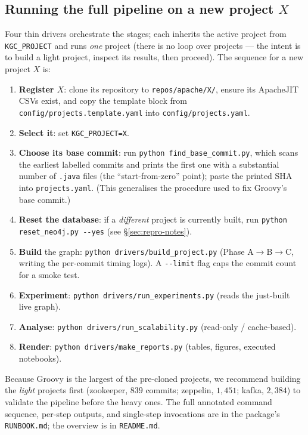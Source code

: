 \documentclass[11pt,a4paper]{article}
\newcommand{\code}[1]{\texttt{#1}}
\begin{document}
	\subsection{Running the full pipeline on a new project \texorpdfstring{$X$}{X}}\label{sec:repro-run}
	Four thin drivers orchestrate the stages; each inherits the active project from
	\code{KGC\_PROJECT} and runs \emph{one} project (there is no loop over projects ---
	the intent is to build a light project, inspect its results, then proceed). The
	sequence for a new project $X$ is:
	\begin{enumerate}[nosep,leftmargin=1.4em]
		\item \textbf{Register $X$}: clone its repository to \code{repos/apache/X/},
		ensure its ApacheJIT CSVs exist, and copy the template block from
		\code{config/projects.template.yaml} into \code{config/projects.yaml}.
		\item \textbf{Select it}: set \code{KGC\_PROJECT=X}.
		\item \textbf{Choose its base commit}: run \code{python find\_base\_commit.py},
		which scans the earliest labelled commits and prints the first one with a
		substantial number of \code{.java} files (the ``start-from-zero'' point); paste
		the printed SHA into \code{projects.yaml}. (This generalises the procedure used
		to fix Groovy's base commit.)
		\item \textbf{Reset the database}: if a \emph{different} project is currently
		built, run \code{python reset\_neo4j.py -{-}yes} (see \S\ref{sec:repro-notes}).
		\item \textbf{Build} the graph: \code{python drivers/build\_project.py}
		(Phase A$\to$B$\to$C, writing the per-commit timing logs). A \code{-{-}limit}
		flag caps the commit count for a smoke test.
		\item \textbf{Experiment}: \code{python drivers/run\_experiments.py} (reads the
		just-built live graph).
		\item \textbf{Analyse}: \code{python drivers/run\_scalability.py} (read-only /
		cache-based).
		\item \textbf{Render}: \code{python drivers/make\_reports.py} (tables, figures,
		executed notebooks).
	\end{enumerate}
	Because Groovy is the largest of the pre-cloned projects, we recommend building the
	\emph{light} projects first (zookeeper, $839$ commits; zeppelin, $1{,}451$; kafka,
	$2{,}384$) to validate the pipeline before the heavy ones. The full annotated
	command sequence, per-step outputs, and single-step invocations are in the
	package's \code{RUNBOOK.md}; the overview is in \code{README.md}.
\end{document}
